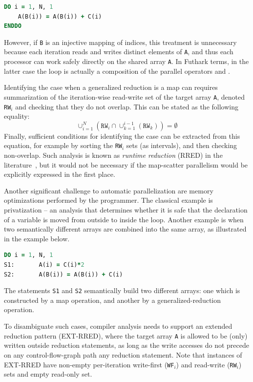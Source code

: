 \begin{lstlisting}[language=fortran]
DO i = 1, N, 1
    A(B(i)) = A(B(i)) + C(i)
ENDDO
\end{lstlisting}

However, if \texttt{B} is an injective mapping of indices, this
treatment is unnecessary because each iteration reads and writes
distinct elements of \texttt{A}, and thus each processor can work
safely directly on the shared array \texttt{A}.  In Futhark terms, in
the latter case the loop is actually a composition of the parallel
operators  and .

Identifying the case when a generalized reduction is a map can
requires summarization of the iteration-wise read-write set of the
target array \texttt{A}, denoted \texttt{RW$_i$} and checking that
they do not overlap.  This can be stated as the following equality:
\[
  \cup_{i=1}^{N}(\texttt{RW}_i\cap\cup_{k=1}^{i-1}(\texttt{RW}_k))=\emptyset
\]
Finally, sufficient conditions for identifying the  case can
be extracted from this equation, for example by sorting the
\texttt{RW$_i$} sets (as intervals), and then checking
non-overlap. Such analysis is known as \textit{runtime reduction}
(RRED) in the literature~\cite{CosPLDI}, but it would not be necessary
if the map-scatter parallelism would be explicitly expressed in the
first place.

Another significant challenge to automatic parallelization are
memory optimizations performed by the programmer. The classical
example is privatization -- an analysis that determines whether
it is safe that the declaration of a variable is moved from outside
to inside the loop.   Another example is when two semantically
different arrays are combined into the same array, as 
illustrated in the example below. 

\begin{lstlisting}[language=fortran]
      DO i = 1, N, 1
S1:       A(i) = C(i)*2
S2:       A(B(i)) = A(B(i)) + C(i)
\end{lstlisting}

The statements \texttt{S1} and \texttt{S2} semantically build two different
arrays: one which is constructed by a map operation, and another
by a generalized-reduction operation.

To disambiguate such cases, compiler analysis needs to support an
extended reduction pattern (EXT-RRED), where the target array
\texttt{A} is allowed to be (only) written outside reduction
statements, as long as the write accesses do not precede on any
control-flow-graph path any reduction statement.  Note that instances
of EXT-RRED have non-empty per-iteration write-first (\texttt{WF$_i$})
and read-write (\texttt{RW$_i$}) sets and empty read-only set.

